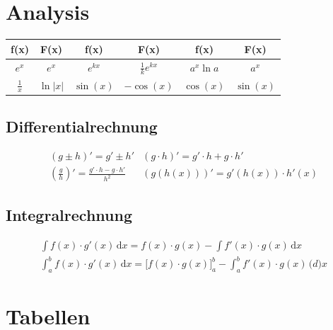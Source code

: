 \documentclass[a4paper,10pt]{article}
\renewcommand*{\arraystretch}{2}
\numberwithin{equation}{section}
\begin{document}
\section{Analysis}


\begin{table}[h]
    \centering
    \begin{tabular}{cc||cc||cc}
        f(x) & F(x) & f(x) & F(x) & f(x) & F(x) \\
        \hline
        \( e^x \) & \( e^x \) &
        \( e^{kx} \) & \( \frac{1}{k} e^{kx} \) &
        \( a^x \ln a \) & \( a^x \) \\
        \( \frac{1}{x} \) & \( \ln |x| \) &
        \( \sin(x) \) & \( -\cos(x) \) &
        \( \cos(x) \) & \( \sin(x) \) \\
        
    \end{tabular}
\end{table}

\subsection{Differentialrechnung}

\[
    \begin{array}{ccc}
        (g \pm h)' = g' \pm h' &
        (g \cdot h)' = g' \cdot h + g \cdot h' \\
        \left( \frac{g}{h} \right)' = \frac{g' \cdot h - g \cdot h'}{h^2} &
        (g(h(x)))' = g'(h(x)) \cdot h'(x)
    \end{array}
\]

\subsection{Integralrechnung}

\begin{gather*}
    \int f(x) \cdot g'(x) \, \mathrm{d}x = f(x) \cdot g(x) - \int f'(x) \cdot g(x) \, \mathrm{d}x \\
    \int_a^b f(x) \cdot g'(x) \, \mathrm{d}x = \big[ f(x) \cdot g(x) \big]_a^b - \int_a^b f'(x) \cdot g(x) \, \mathrm(d)x
\end{gather*}


\clearpage
\section{Tabellen}

\renewcommand{\arraystretch}{1.0}
\setlength{\tabcolsep}{3pt}
\end{document}

